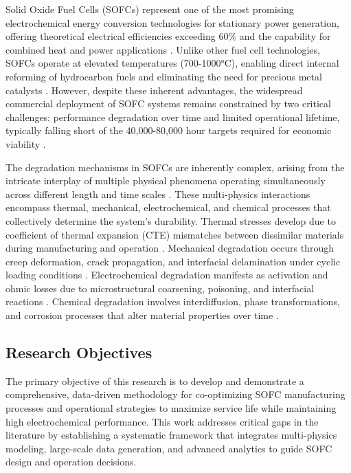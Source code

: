 \documentclass[11pt,a4paper]{article}
\begin{document}
Solid Oxide Fuel Cells (SOFCs) represent one of the most promising electrochemical energy conversion technologies for stationary power generation, offering theoretical electrical efficiencies exceeding 60\% and the capability for combined heat and power applications \cite{Stambouli2002, Singhal2000}. Unlike other fuel cell technologies, SOFCs operate at elevated temperatures (700-1000°C), enabling direct internal reforming of hydrocarbon fuels and eliminating the need for precious metal catalysts \cite{Minh2004}. However, despite these inherent advantages, the widespread commercial deployment of SOFC systems remains constrained by two critical challenges: performance degradation over time and limited operational lifetime, typically falling short of the 40,000-80,000 hour targets required for economic viability \cite{Javed2023, Zhang2022}.

The degradation mechanisms in SOFCs are inherently complex, arising from the intricate interplay of multiple physical phenomena operating simultaneously across different length and time scales \cite{Mahato2015}. These multi-physics interactions encompass thermal, mechanical, electrochemical, and chemical processes that collectively determine the system's durability. Thermal stresses develop due to coefficient of thermal expansion (CTE) mismatches between dissimilar materials during manufacturing and operation \cite{Selimovic2005}. Mechanical degradation occurs through creep deformation, crack propagation, and interfacial delamination under cyclic loading conditions \cite{Nakajo2012}. Electrochemical degradation manifests as activation and ohmic losses due to microstructural coarsening, poisoning, and interfacial reactions \cite{Hubert2018}. Chemical degradation involves interdiffusion, phase transformations, and corrosion processes that alter material properties over time \cite{Yokokawa2008}.

\subsection{Research Objectives}

The primary objective of this research is to develop and demonstrate a comprehensive, data-driven methodology for co-optimizing SOFC manufacturing processes and operational strategies to maximize service life while maintaining high electrochemical performance. This work addresses critical gaps in the literature by establishing a systematic framework that integrates multi-physics modeling, large-scale data generation, and advanced analytics to guide SOFC design and operation decisions.
\end{document}
